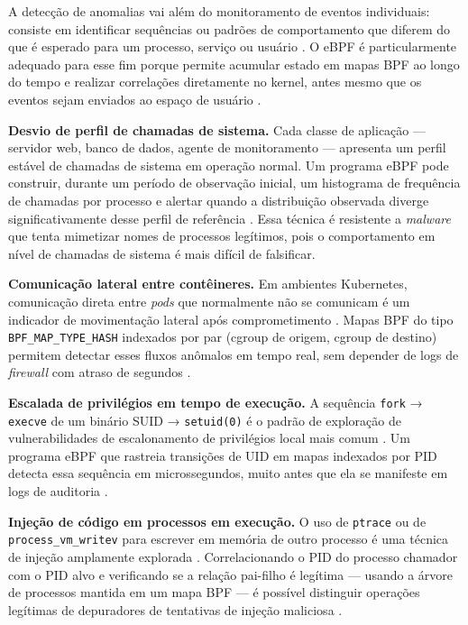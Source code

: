 A detecção de anomalias vai além do monitoramento de eventos individuais: consiste
em identificar sequências ou padrões de comportamento que diferem do que é esperado
para um processo, serviço ou usuário \cite{majors2022}.
O eBPF é particularmente adequado para esse fim porque permite acumular estado em
mapas BPF ao longo do tempo e realizar correlações diretamente no kernel, antes
mesmo que os eventos sejam enviados ao espaço de usuário \cite{linuxkernel2024}.

\textbf{Desvio de perfil de chamadas de sistema.}
Cada classe de aplicação — servidor web, banco de dados, agente de monitoramento
— apresenta um perfil estável de chamadas de sistema em operação normal.
Um programa eBPF pode construir, durante um período de observação inicial, um
histograma de frequência de chamadas por processo e alertar quando a distribuição
observada diverge significativamente desse perfil de referência
\cite{gregg2019}.
Essa técnica é resistente a \textit{malware} que tenta mimetizar nomes de
processos legítimos, pois o comportamento em nível de chamadas de sistema é mais
difícil de falsificar.

\textbf{Comunicação lateral entre contêineres.}
Em ambientes Kubernetes, comunicação direta entre \textit{pods} que normalmente
não se comunicam é um indicador de movimentação lateral após comprometimento
\cite{cassagnes2020}.
Mapas BPF do tipo \texttt{BPF\_MAP\_TYPE\_HASH} indexados por par
(cgroup de origem, cgroup de destino) permitem detectar esses fluxos anômalos em
tempo real, sem depender de logs de \textit{firewall} com atraso de segundos
\cite{linuxkernel2024}.

\textbf{Escalada de privilégios em tempo de execução.}
A sequência \texttt{fork} → \texttt{execve} de um binário SUID → \texttt{setuid(0)}
é o padrão de exploração de vulnerabilidades de escalonamento de privilégios local
mais comum \cite{gregg2020}.
Um programa eBPF que rastreia transições de UID em mapas indexados por PID detecta
essa sequência em microssegundos, muito antes que ela se manifeste em logs de
auditoria \cite{gregg2019}.

\textbf{Injeção de código em processos em execução.}
O uso de \texttt{ptrace} ou de \texttt{process\_vm\_writev} para escrever em
memória de outro processo é uma técnica de injeção amplamente explorada
\cite{gregg2019}.
Correlacionando o PID do processo chamador com o PID alvo e verificando se a
relação pai-filho é legítima — usando a árvore de processos mantida em um mapa
BPF — é possível distinguir operações legítimas de depuradores de tentativas de
injeção maliciosa \cite{majors2022}.


